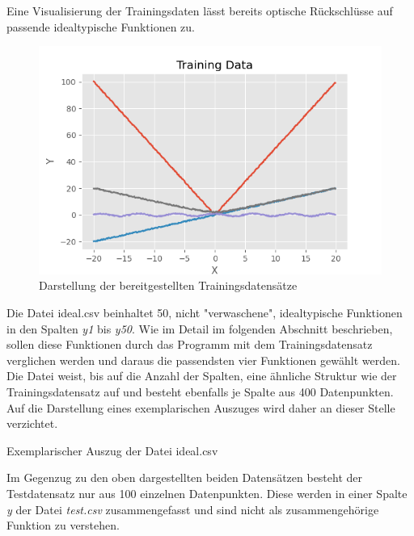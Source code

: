 Eine Visualisierung der Trainingsdaten lässt bereits optische Rückschlüsse auf passende idealtypische Funktionen zu.
\begin{figure}[h]
\centering
\includegraphics[width=13cm]{../output/figures/train.png}
\caption{Darstellung der bereitgestellten Trainingsdatensätze \cite{Gage:18}}\label{fig:train}
\end{figure}

Die Datei ideal.csv beinhaltet 50, nicht "verwaschene", idealtypische Funktionen in den Spalten \emph{y1} bis \emph{y50}. Wie im Detail im folgenden Abschnitt beschrieben, sollen diese Funktionen durch das Programm mit dem Trainingsdatensatz verglichen werden und daraus die passendsten vier Funktionen gewählt werden. Die Datei weist, bis auf die Anzahl der Spalten, eine ähnliche Struktur wie der Trainingsdatensatz auf und besteht ebenfalls je Spalte aus 400 Datenpunkten. Auf die Darstellung eines exemplarischen Auszuges wird daher an dieser Stelle verzichtet.

\begin{table}[H]
\small
\centering
{}
\caption{Exemplarischer Auszug der Datei ideal.csv}
\label{tab:ideal.csv}
\end{table} 

Im Gegenzug zu den oben dargestellten beiden Datensätzen besteht der Testdatensatz nur aus 100 einzelnen Datenpunkten. Diese werden in einer Spalte \emph{y} der Datei \emph{test.csv} zusammengefasst und sind nicht als zusammengehörige Funktion zu verstehen. 

